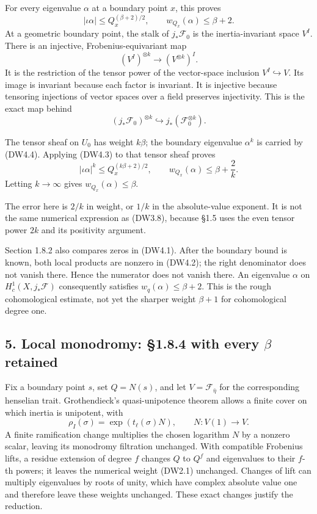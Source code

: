 For every eigenvalue \(\alpha\) at a boundary point \(x\), this proves
\[
|\iota\alpha|\le Q_x^{(\beta+2)/2},
\qquad
w_{Q_x}(\alpha)\le\beta+2.
\tag{DW4.3}
\] At a geometric boundary point, the stalk of \(j_*\mathcal F_0\) is
the inertia-invariant space \(V^I\). There is an injective,
Frobenius-equivariant map \[
(V^I)^{\otimes k}\longrightarrow(V^{\otimes k})^I.
\tag{DW4.4}
\] It is the restriction of the tensor power of the vector-space
inclusion \(V^I\hookrightarrow V\). Its image is invariant because each
factor is invariant. It is injective because tensoring injections of
vector spaces over a field preserves injectivity. This is the exact map
behind \[
(j_*\mathcal F_0)^{\otimes k}
\hookrightarrow j_*(\mathcal F_0^{\otimes k}).
\tag{DW4.5}
\]

The tensor sheaf on \(U_0\) has weight \(k\beta\); the boundary
eigenvalue \(\alpha^k\) is carried by (DW4.4). Applying (DW4.3) to that
tensor sheaf proves \[
|\iota\alpha|^k\le Q_x^{(k\beta+2)/2},
\qquad
w_{Q_x}(\alpha)\le\beta+\frac2k.
\tag{DW4.6}
\] Letting \(k\to\infty\) gives \(w_{Q_x}(\alpha)\le\beta\).

The error here is \(2/k\) in weight, or \(1/k\) in the absolute-value
exponent. It is not the same numerical expression as (DW3.8), because
§1.5 uses the even tensor power \(2k\) and its positivity argument.

Section 1.8.2 also compares zeros in (DW4.1). After the boundary bound
is known, both local products are nonzero in (DW4.2); the right
denominator does not vanish there. Hence the numerator does not vanish
there. An eigenvalue \(\alpha\) on \(H_c^1(X,j_*\mathcal F)\)
consequently satisfies \(w_q(\alpha)\le\beta+2\). This is the rough
cohomological estimate, not yet the sharper weight \(\beta+1\) for
cohomological degree one.

\subsection{\texorpdfstring{5. Local monodromy: §1.8.4 with every
\(\beta\)
retained}{5. Local monodromy: §1.8.4 with every \textbackslash beta retained}}\label{local-monodromy-1.8.4-with-every-beta-retained}

Fix a boundary point \(s\), set \(Q=N(s)\), and let
\(V=\mathcal F_{\bar\eta}\) for the corresponding henselian trait.
Grothendieck's quasi-unipotence theorem allows a finite cover on which
inertia is unipotent, with \[
\rho_I(\sigma)=\exp(t_\ell(\sigma)N),
\qquad
N:V(1)\longrightarrow V.
\tag{DW5.1}
\] A finite ramification change multiplies the chosen logarithm \(N\) by
a nonzero scalar, leaving its monodromy filtration unchanged. With
compatible Frobenius lifts, a residue extension of degree \(f\) changes
\(Q\) to \(Q^f\) and eigenvalues to their \(f\)-th powers; it leaves the
numerical weight (DW2.1) unchanged. Changes of lift can multiply
eigenvalues by roots of unity, which have complex absolute value one and
therefore leave these weights unchanged. These exact changes justify the
reduction.

